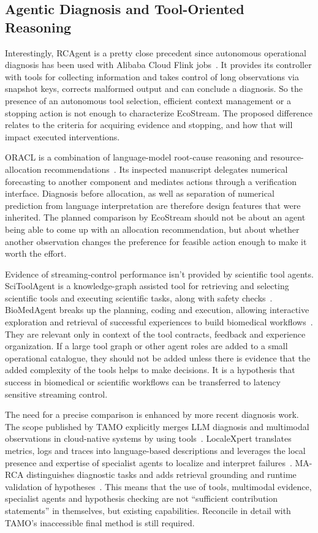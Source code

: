 \subsection{Agentic Diagnosis and Tool-Oriented Reasoning}
Interestingly, RCAgent is a pretty close precedent since autonomous operational diagnosis has been used with Alibaba Cloud Flink jobs~\cite{wang2024rcagent}. It provides its controller with tools for collecting information and takes control of long observations via snapshot keys, corrects malformed output and can conclude a diagnosis. So the presence of an autonomous tool selection, efficient context management or a stopping action is not enough to characterize EcoStream. The proposed difference relates to the criteria for acquiring evidence and stopping, and how that will impact executed interventions.

ORACL is a combination of language-model root-cause reasoning and resource-allocation recommendations~\cite{bai2026oracl}. Its inspected manuscript delegates numerical forecasting to another component and mediates actions through a verification interface. Diagnosis before allocation, as well as separation of numerical prediction from language interpretation are therefore design features that were inherited. The planned comparison by EcoStream should not be about an agent being able to come up with an allocation recommendation, but about whether another observation changes the preference for feasible action enough to make it worth the effort.

Evidence of streaming-control performance isn't provided by scientific tool agents. SciToolAgent is a knowledge-graph assisted tool for retrieving and selecting scientific tools and executing scientific tasks, along with safety checks~\cite{ding2025scitoolagent}. BioMedAgent breaks up the planning, coding and execution, allowing interactive exploration and retrieval of successful experiences to build biomedical workflows~\cite{bu2026biomedagent}. They are relevant only in context of the tool contracts, feedback and experience organization. If a large tool graph or other agent roles are added to a small operational catalogue, they should not be added unless there is evidence that the added complexity of the tools helps to make decisions. It is a hypothesis that success in biomedical or scientific workflows can be transferred to latency sensitive streaming control.

The need for a precise comparison is enhanced by more recent diagnosis work. The scope published by TAMO explicitly merges LLM diagnosis and multimodal observations in cloud-native systems by using tools~\cite{zhang2025tamo}. LocaleXpert translates metrics, logs and traces into language-based descriptions and leverages the local presence and expertise of specialist agents to localize and interpret failures~\cite{zhong2026localexpert}. MA-RCA distinguishes diagnostic tasks and adds retrieval grounding and runtime validation of hypotheses~\cite{fu2026marca}. This means that the use of tools, multimodal evidence, specialist agents and hypothesis checking are not “sufficient contribution statements” in themselves, but existing capabilities. Reconcile in detail with TAMO's inaccessible final method is still required.

